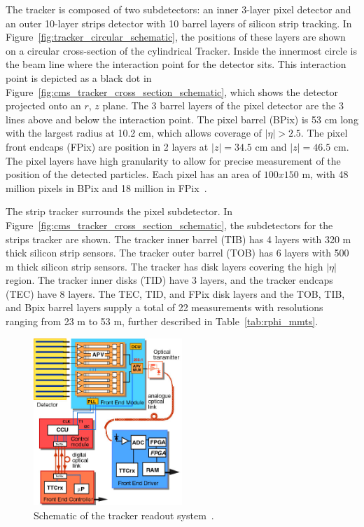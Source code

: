 The tracker is composed of two subdetectors: an inner 3-layer pixel detector and an outer 10-layer strips detector with 10 barrel layers of silicon strip tracking. In Figure~\ref{fig:tracker_circular_schematic}, the positions of these layers are shown on a circular cross-section of the cylindrical Tracker. Inside the innermost circle is the beam line where the interaction point for the detector sits. This interaction point is depicted as a black dot in Figure~\ref{fig:cms_tracker_cross_section_schematic}, which shows the detector projected onto an $r$, $z$ plane.  The 3 barrel layers of the pixel detector are the 3 lines above and below the interaction point. The pixel barrel (BPix) is 53 cm long with the largest radius at 10.2 cm, which allows coverage of $|\eta| > 2.5$. The pixel front endcaps (FPix) are position in 2 layers at $|z| = 34.5$ cm and $|z| = 46.5$ cm. The pixel layers have high granularity to allow for precise measurement of the position of the detected particles. Each pixel has an area of $100x150$ \textmu m, with 48 million pixels in BPix and 18 million in FPix~\cite{CMSExperiment}.

The strip tracker surrounds the pixel subdetector. In Figure~\ref{fig:cms_tracker_cross_section_schematic}, the subdetectors for the strips tracker are shown. The tracker inner barrel (TIB) has 4 layers with 320 \textmu m thick silicon strip sensors. The tracker outer barrel (TOB) has 6 layers with 500 \textmu m thick silicon strip sensors. The tracker has disk layers covering the high $|\eta|$ region. The tracker inner disks (TID) have 3 layers, and the tracker endcaps (TEC) have 8 layers. The TEC, TID, and FPix disk layers and the TOB, TIB, and Bpix barrel layers supply a total of 22 measurements with resolutions ranging from 23 \textmu m to 53 \textmu m, further described in Table~\ref{tab:rphi_mmts}.

\begin{figure}[h]
\centering
\includegraphics[width=0.5\textwidth]{figures/Read-out-scheme-of-the-CMS-Tracker.png}
\caption{Schematic of the tracker readout system~\cite{CMSExperiment}.} \label{fig:tracker_readout}
\end{figure}

